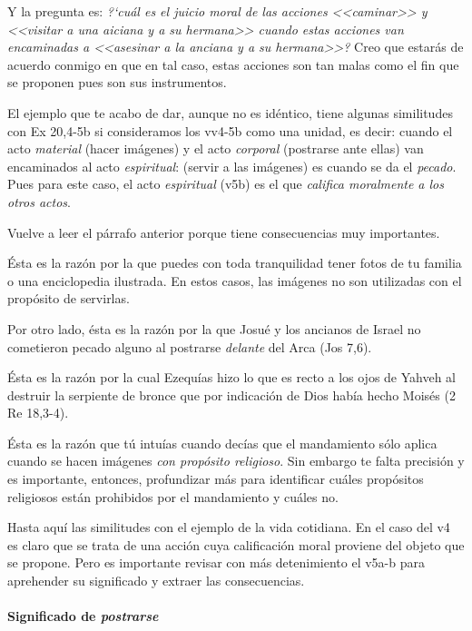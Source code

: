 \documentclass{article}
\begin{document}
Y la pregunta es: \emph{?`cu\'al es el juicio moral de las acciones <<caminar>> y <<visitar a una aiciana y a su hermana>> cuando estas acciones van encaminadas a <<asesinar a la anciana y a su hermana>>?} Creo que estar\'as de acuerdo conmigo en que en tal caso, estas acciones son tan malas como el fin que se proponen pues son sus instrumentos.

El ejemplo que te acabo de dar, aunque no es id\'entico, tiene algunas similitudes con Ex 20,4-5b si consideramos los vv4-5b como una unidad, es decir: cuando el acto \emph{material} (hacer im\'agenes) y el acto \emph{corporal} (postrarse ante ellas) van encaminados al acto \emph{espiritual}: (servir a las im\'agenes) es cuando se da el \emph{pecado}. Pues para este caso, el acto \emph{espiritual} (v5b) es el que \emph{califica moralmente a los otros actos}.

Vuelve a leer el p\'arrafo anterior porque tiene consecuencias muy importantes.

\'Esta es la raz\'on por la que puedes con toda tranquilidad tener fotos de tu familia o una enciclopedia ilustrada. En estos casos, las im\'agenes no son utilizadas con el prop\'osito de servirlas.

Por otro lado, \'esta es la raz\'on por la que Josu\'e y los ancianos de Israel no cometieron pecado alguno al postrarse \emph{delante} del Arca (Jos 7,6).

\'Esta es la raz\'on por la cual Ezequ\'{i}as hizo lo que es recto a los ojos de Yahveh al destruir la serpiente de bronce que por indicaci\'on de Dios hab\'{i}a hecho Mois\'es (2 Re 18,3-4).

\'Esta es la raz\'on que t\'u intu\'{i}as cuando dec\'{i}as que el mandamiento s\'olo aplica cuando se hacen im\'agenes \emph{con prop\'osito religioso}. Sin embargo te falta precisi\'on y es importante, entonces, profundizar m\'as para identificar cu\'ales prop\'ositos religiosos est\'an prohibidos por el mandamiento y cu\'ales no.

Hasta aqu\'{i} las similitudes con el ejemplo de la vida cotidiana. En el caso del v4 es claro que se trata de una acci\'on cuya calificaci\'on moral proviene del objeto que se propone. Pero es importante revisar con m\'as detenimiento el v5a-b para aprehender su significado y extraer las consecuencias.

\paragraph{Significado de \emph{postrarse}}
\end{document}

